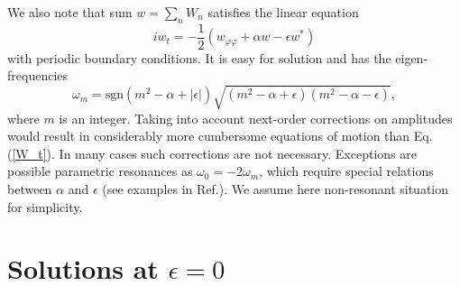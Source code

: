 \documentclass[pra,twocolumn,showpacs]{revtex4}
\begin{document}
We also note that sum $w=\sum_n W_n$ satisfies the linear equation
\begin{equation}
iw_t=-\frac{1}{2}(w_{\varphi\varphi}+\alpha w-\epsilon w^*)
\label{w}
\end{equation}
with periodic boundary conditions. It is easy for solution and has the eigen-frequencies 
\begin{equation}
\omega_m=\mbox{sgn}(m^2-\alpha+|\epsilon|) \sqrt{(m^2-\alpha+\epsilon)(m^2-\alpha-\epsilon)},
\end{equation}
where $m$ is an integer. Taking into account next-order corrections on amplitudes would result in
considerably more cumbersome equations of motion than Eq.(\ref{W_t}). In many cases such corrections 
are not necessary. Exceptions are possible parametric resonances as $\omega_0=-2\omega_m$, which 
require special relations between $\alpha$ and $\epsilon$ (see examples in Ref.\cite{R2017-3}).
We assume here non-resonant situation for simplicity.


\section{Solutions at $\epsilon =0$}
\end{document}
